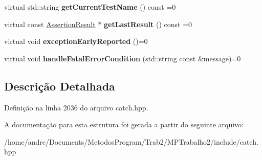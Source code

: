 \begin{DoxyCompactItemize}
\item 
virtual std\+::string {\bfseries get\+Current\+Test\+Name} () const =0\hypertarget{structCatch_1_1IResultCapture_aea1617f4a84cc648246aa3ed6918b5bf}{}\label{structCatch_1_1IResultCapture_aea1617f4a84cc648246aa3ed6918b5bf}

\item 
virtual const \hyperlink{classCatch_1_1AssertionResult}{Assertion\+Result} $\ast$ {\bfseries get\+Last\+Result} () const =0\hypertarget{structCatch_1_1IResultCapture_ab18872c89fab97405a56e9c6a4919736}{}\label{structCatch_1_1IResultCapture_ab18872c89fab97405a56e9c6a4919736}

\item 
virtual void {\bfseries exception\+Early\+Reported} ()=0\hypertarget{structCatch_1_1IResultCapture_ae63ecec95db4c236c63ecf616f483810}{}\label{structCatch_1_1IResultCapture_ae63ecec95db4c236c63ecf616f483810}

\item 
virtual void {\bfseries handle\+Fatal\+Error\+Condition} (std\+::string const \&message)=0\hypertarget{structCatch_1_1IResultCapture_a7d995222301e6605f26549726b30c3ee}{}\label{structCatch_1_1IResultCapture_a7d995222301e6605f26549726b30c3ee}

\end{DoxyCompactItemize}


\subsection{Descrição Detalhada}


Definição na linha 2036 do arquivo catch.\+hpp.



A documentação para esta estrutura foi gerada a partir do seguinte arquivo\+:\begin{DoxyCompactItemize}
\item 
/home/andre/\+Documents/\+Metodos\+Program/\+Trab2/\+M\+P\+Trabalho2/include/catch.\+hpp\end{DoxyCompactItemize}
